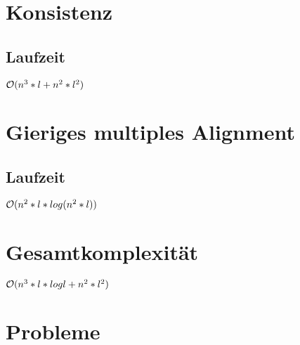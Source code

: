 \section{Konsistenz}

\subsection{Laufzeit}
$\mathcal{O}(n^3*l + n^2*l^2)$

\section{Gieriges multiples Alignment}

\subsection{Laufzeit}
$\mathcal{O}(n^2*l*log(n^2*l))$

\section{Gesamtkomplexität}
$\mathcal{O}(n^3*l*log l + n^2*l^2)$

\section{Probleme}
